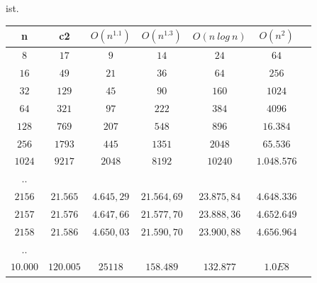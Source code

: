 ist.


\setlength{\tabcolsep}{0.8em}
{\renewcommand{\arraystretch}{1.7}%
\begin{table} %
    \begin{center}
        \begin{tabular}{|c |c |c |c | c| c| c}
            \hline
            \textbf{n} & \textbf{c2}  &  \textbf{$O(n^{1.1})$} & \textbf{$O(n^{1.3})$} & \textbf{$O(n\ log\ n)$} & \textbf{$O(n^2)$}  \\


            \hline
            $8$ & $17$  & \cellcolor{green!25}$9$ & \cellcolor{green!25}$14$ &  \cellcolor{red!25}$24$ & \cellcolor{red!25}$64$\\
            \hline
            $16$ & $49$ & \cellcolor{green!25}$21$ & \cellcolor{green!25}$36$ &\cellcolor{red!25}$64$ & \cellcolor{red!25}$256$ \\
            \hline
            $32$ & $129$ &  \cellcolor{green!25}$45$ & \cellcolor{green!25}$90$ & \cellcolor{red!25}$160$ &\cellcolor{red!25}$1024$ \\
            \hline
            $64$ & $321$ &  \cellcolor{green!25}$97$ & \cellcolor{green!25}$222$ & \cellcolor{red!25}$384$ & \cellcolor{red!25}$4096$ \\
            \hline
            $128$ & $769$ &   \cellcolor{green!25}$207$ & \cellcolor{green!25}$548$ & \cellcolor{red!25}$896$ & \cellcolor{red!25}$16.384$ \\

            \hline
            $256$ & $1793$ &   \cellcolor{green!25}$445$ & \cellcolor{green!25}$1351$ & \cellcolor{red!25}$2048$ & \cellcolor{red!25}$65.536$ \\
            \hline

            $1024$ & $9217$ &   \cellcolor{green!25}$2048$ & \cellcolor{green!25}$8192$ & \cellcolor{red!25}$10240$ & \cellcolor{red!25}$1.048.576$ \\
            \hline

            .. & & & & &  \\
            \hline
            $2156$ & $21.565$ &   \cellcolor{green!25}$4.645,29$ & \cellcolor{green!25}$21.564,69$ & \cellcolor{red!25}$23.875,84$ &\cellcolor{red!25}$4.648.336$ \\  \hline
            $2157$ & $21.576$ &  \cellcolor{green!25}$4.647,66$ & \cellcolor{red!25}$21.577,70$ & \cellcolor{red!25}$23.888,36$ &\cellcolor{red!25}$4.652.649$  \\  \hline
            $2158$ & $21.586$ &  \cellcolor{green!25}$4.650,03$ & \cellcolor{red!25}$21.590,70$ & \cellcolor{red!25}$23.900,88$ & \cellcolor{red!25}$4.656.964$  \\
            \hline
            ..  & & & & &  \\
            \hline
            $10.000$ & $120.005$ &    \cellcolor{green!25}$25118$ & \cellcolor{red!25}$158.489$ & \cellcolor{yellow!25}$132.877$ &\cellcolor{red!25}$1.0E8$ \\
            \hline


\end{tabular}
\end{center}
\end{table}}
